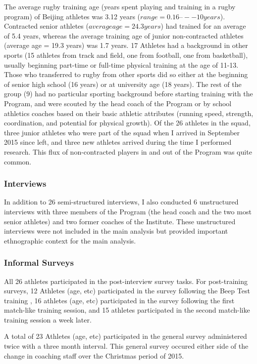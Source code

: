 The average rugby training age (years spent playing and training in a rugby program) of Beijing athletes was 3.12 years ($range = 0.16 –-- 10 years$).  Contracted senior athletes ($average age = 24.3 years$) had trained for an average of 5.4 years, whereas the average training age of junior non-contracted athletes (average age = 19.3 years) was 1.7 years.  17 Athletes had a background in other sports (15 athletes from track and field, one from football, one from basketball), usually beginning part-time or full-time physical training at the age of 11-13.  Those who transferred to rugby from other sports did so either at the beginning of senior high school (16 years) or at university age (18 years).  The rest of the group (9) had no particular sporting background before starting training with the Program, and were scouted by the head coach of the Program or by school athletics coaches based on their basic athletic attributes (running speed, strength, coordination, and potential for physical growth).  Of the 26 athletes in the squad, three junior athletes who were part of the squad when I arrived in September 2015 since left, and three new athletes arrived during the time I performed research. This flux of non-contracted players in and out of the Program was quite common.


  \subsubsection{Interviews}

  In addition to 26 semi-structured interviews, I also conducted 6 unstructured interviews with three members of the Program (the head coach and the two most senior athletes) and two former coaches of the Institute.  These unstructured interviews were not included in the main analysis but provided important ethnographic context for the main analysis.

  \subsubsection{Informal Surveys}

  All 26 athletes participated in the post-interview survey tasks.  For post-training surveys, 12 Athletes (age, etc) participated in the survey following the Beep Test training , 16 athletes (age, etc) participated in the survey following the first match-like training session, and 15 athletes participated in the second match-like training session a week later.

  A total of 23 Athletes (age, etc) participated in the general survey administered twice with a three month interval. This general survey occured either side of the change in coaching staff over the Christmas period of 2015.






